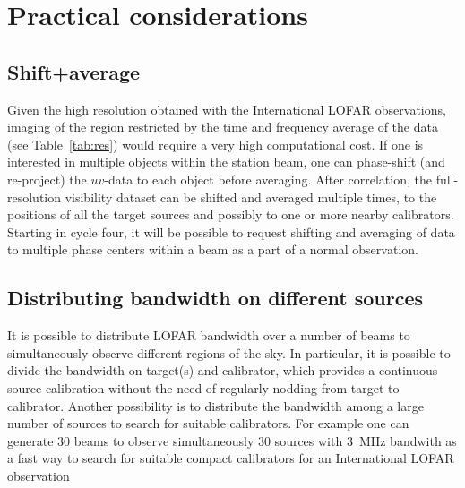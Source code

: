 \documentclass[graybox]{svmult}
\begin{document}
\section{Practical considerations}
\label{sec:practical}

\subsection{Shift+average}\label{sec:shift}

Given the high resolution obtained with the International LOFAR observations,
imaging of the region restricted by the time and frequency average of the data
(see Table~\ref{tab:res}) would require a very high computational cost. If one
is interested in multiple objects within the station beam, one can phase-shift
(and re-project) the $uv$-data to each object before averaging.  After
correlation, the full-resolution visibility dataset can be shifted and averaged
multiple times, to the positions of all the target sources and possibly to one
or more nearby calibrators. Starting in cycle four, it will be possible to
request shifting and averaging of data to multiple phase centers within a beam
as a part of a normal observation.

\subsection{Distributing bandwidth on different sources}\label{sec:bandwidth}

It is possible to distribute LOFAR bandwidth over a number of beams to
simultaneously observe different regions of the sky. In particular, it is
possible to divide the bandwidth on target(s) and calibrator, which provides a
continuous source calibration without the need of regularly nodding from target
to calibrator. Another possibility is to distribute the bandwidth among a large
number of sources to search for suitable calibrators. For example one can
generate 30 beams to observe simultaneously 30 sources with 3~MHz bandwith as a
fast way to search for suitable compact calibrators for an
International LOFAR observation \citep[see i.e.][]{moldon15}
\end{document}
